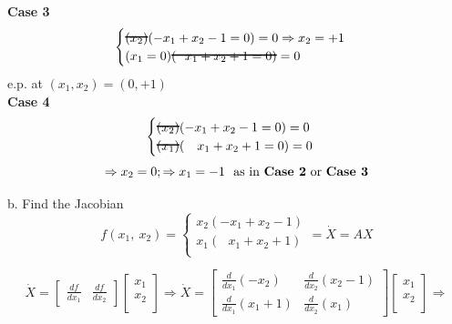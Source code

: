 \documentclass{homeworg}
\newcommand\hcancel[2][black]{\setbox0=\hbox{$#2$}%
\rlap{\raisebox{.45\ht0}{\textcolor{#1}{\rule{\wd0}{1pt}}}}#2}
\begin{document}
\noindent
\textbf{Case 3}
\begin{equation*}
    \begin{cases}
      \hcancel{(x_2)}(-  x_1 + x_2 -1=0)=0 \Rightarrow x_2 = +1\\
      (x_1=0)\hcancel{(~~x_1 + x_2 + 1 =0)}=0
    \end{cases}
\end{equation*}
\noindent
e.p. at $(x_1 , x_2) = (0,+1)$\\

\noindent
\textbf{Case 4}
\begin{equation*}
    \begin{cases}
      \hcancel{(x_2)}(-  x_1 + x_2 -1 =0)=0 \\
      \hcancel{(x_1)}(~~~x_1 + x_2 + 1 =0)=0 \\
    \end{cases}
\end{equation*}
\begin{equation*}
\Rightarrow x_2 = 0 ; \Rightarrow x_1 = -1 \text{ \ as in \textbf{Case 2} or \textbf{Case 3}}
\end{equation*}

\noindent
b. Find the Jacobian\\


\begin{equation*} %
  f(x_1,~x_2) =
  \begin{cases}
    x_2 (-x_1 + x_2 -1)\\
    x_1 (~~~x_1 + x_2 + 1)\\
  \end{cases}
  = \dot{X} = AX
\end{equation*}


\begin{equation*} %
\dot{X} =
  \begin{bmatrix}
    \frac{d f}{d x_1} & \frac{d f}{d x_2}
  \end{bmatrix}
  \begin{bmatrix}
    x_1 \\
    x_2 \\
  \end{bmatrix}
  \Rightarrow
  \dot{X} =
  \begin{bmatrix}
    \frac{d }{d x_1}(-x_2) & \frac{d }{d x_2}(x_2 - 1) \\
    \frac{d }{d x_1}(x_1 +1) & \frac{d }{d x_2}(x_1)
  \end{bmatrix}
  \begin{bmatrix}
    x_1 \\
    x_2 \\
  \end{bmatrix}
  \Rightarrow
\end{equation*}
\end{document}
